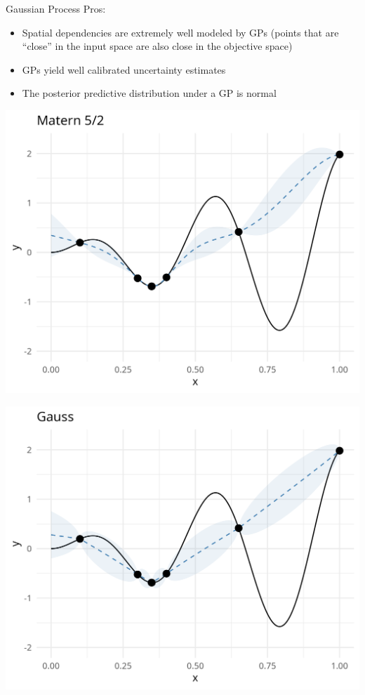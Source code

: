 \documentclass[11pt,compress,t,notes=noshow, xcolor=table]{beamer}
\begin{document}
\begin{vbframe}{Gaussian Process}
Pros:
\begin{itemize}
  \item Spatial dependencies are extremely well modeled by GPs (points that are \enquote{close} in the input space are also close in the objective space)
  \item GPs yield well calibrated uncertainty estimates
  \item The posterior predictive distribution under a GP is normal
\end{itemize}

\vspace{+0.45cm}

\begin{minipage}[b]{0.45\textwidth}
  \includegraphics[width = \textwidth]{figure_man/surrogate_0.png}
\end{minipage}
\hfill
\begin{minipage}[b]{0.45\textwidth}
  \includegraphics[width = \textwidth]{figure_man/surrogate_1.png}
\end{minipage}


\end{vbframe}
\end{document}
